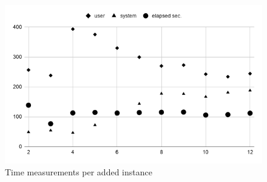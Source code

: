 \begin{figure}
  \centering
  \includegraphics[width=\linewidth]{experiments/speedup-clean.png}
  \caption{Time measurements per added instance}
  \label{fig:speedup}
\end{figure}

%   


